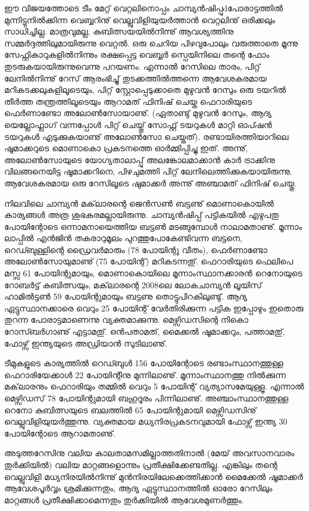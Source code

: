 ഈ വിജയത്തോടെ ടീം മേറ്റ് വെറ്റലിനൊപ്പം ചാമ്പ്യന്‍ഷിപ്പുdപോരാട്ടത്തില്‍ മുന്നിട്ടുനില്‍ക്കിന്ന വെബ്ബറിനു് 
വെല്ലുവിളിയുയര്‍ത്താന്‍ വെറ്റലിനു് ഒരിക്കലും സാധിച്ചില്ല. മാത്രവുമല്ല, കുബിത്സയയില്‍നിന്നു് ആവശ്യത്തിനു 
സമ്മര്‍ദ്ദത്തിലുമായിരുന്നു വെറ്റല്‍. ഒരു ചെറിയ പിഴവുപോലും വരുത്താതെ മൂന്നു സേഫ്റ്റികാറുകളില്‍നിന്നും രക്ഷപ്പെട്ട 
വെബ്ബര്‍ സ്പെയിനിലെ തന്റെ ഫോം തുടരുകയായിരുന്നുവെന്നു പറയണം. എന്നാല്‍ റേസിലെ താരം, പിറ്റ് ലേനില്‍നിന്നു് 
റേസ് ആരംഭിച്ചു് തുടക്കത്തില്‍ത്തന്നെ ആവേശകരമായ മറികടക്കലുകളിലൂടെയും, പിറ്റ് സ്റ്റോപ്പെടുക്കാതെ മുഴുവന്‍ റേസും 
ഒരു ടയറില്‍ തീര്‍ത്ത തന്ത്രത്തിലൂടെയും ആറാമത് ഫിനിഷ് ചെയ്ത ഫെറാരിയുടെ ഫെര്‍ണാണ്ടോ അലോണ്‍സോയാണു്. 
(ഏതാണ്ടു് മുഴുവന്‍ റേസും, ആദ്യ യെല്ലോഫ്ലാഗ് വന്നപ്പോള്‍ പിറ്റ് ചെയ്തു് സോഫ്റ്റ് ടയറുകള്‍ മാറ്റി ഓപ്ഷന്‍ ടയറുകള്‍ 
എടുക്കുകയാണു് അലോണ്‍സോ ചെയ്തത്). രണ്ടായിരത്തിയാറിലെ ഷൂമാക്കറുടെ മൊണാകൊ പ്രകടനത്തെ ഓര്‍മ്മിപ്പിച്ചു 
ഇത്. അന്നു്, അലോണ്‍സോയുടെ യോഗ്യതാലാപ്പു് അലങ്കോലമാക്കാന്‍ കാര്‍ ട്രാക്കിനു വിലങ്ങനെയിട്ട ഷൂമാക്കറിനെ, 
പിഴചുമത്തി പിറ്റ് ലേനിലെത്തിക്കുകയായിരുന്നു. ആവേശകരമായ ഒരു റേസിലൂടെ ഷുമാക്കര്‍ അന്നു് അഞ്ചാമത് ഫിനിഷ് 
ചെയ്തു.

നിലവിലെ ചാമ്പ്യന്‍ മക്‌ലാരന്റെ ജെന്‍സണ്‍ ബട്ടണു് മൊണാകൊയില്‍ കാര്യങ്ങള്‍ അത്ര ശുഭകരമല്ലായിരുന്നു. 
ചാമ്പ്യന്‍ഷിപ്പ് പട്ടികയില്‍ എഴുപതു പോയിന്റോടെ ഒന്നാമനായെത്തിയ ബട്ടണ്‍ മടങ്ങുമ്പോള്‍ നാലാമതാണു്. മൂന്നാം 
ലാപ്പില്‍ എന്‍ജിന്‍ തകരാറുമൂലം പുറത്തുപോകേണ്ടിവന്ന ബട്ടനെ, റെഡ്ബുള്ളിന്റെ ഡ്രൈവര്‍മാരും (78 പോയിന്റു വീതം),
ഫെര്‍ണാണ്ടോ അലോണ്‍സോയുമാണു് (75 പോയിന്റ്) മറികടന്നതു്. ഫെറാരിയുടെ ഫെലിപെ മസ്സ 61 പോയിന്റുമായും, 
മൊണാകൊയിലെ മൂന്നാംസ്ഥാനക്കാരന്‍ റെനോയുടെ റോബര്‍ട്ട് കുബിത്സയും, മക്‌ലാരന്റെ 2008ലെ ലോകചാമ്പ്യന്‍ 
ലൂയിസ് ഹാമില്‍ട്ടണ്‍ 59 പോയിന്റുമായും ബട്ടണു തൊട്ടുപിറകിലുണ്ടു്. ആദ്യ ഏട്ടുസ്ഥാനക്കാരെ വെറും 25 പോയിന്റ് 
വേര്‍തിരിക്കുന്ന പട്ടിക ഇപ്പോഴും ഇതൊരു തുറന്ന പോരാട്ടമാണെന്നു വ്യക്തമാക്കുന്നു. മെഴ്സിഡസിന്റെ നികൊ 
റോസ്ബര്‍ഗാണു് എട്ടാമതു്. ഒന്‍പതാമത്, മൈക്കല്‍ ഷൂമാക്കറും, പത്താമതു്, ഫോഴ്സ് ഇന്ത്യയുടെ അഡ്രിയാന്‍ സുടിലാണു്.

ടീമുകളുടെ കാര്യത്തില്‍ റെഡ്ബുള്‍ 156 പോയിന്റോടെ രണ്ടാംസ്ഥാനത്തുള്ള ഫെറാരിയേക്കാള്‍ 22 പോയിന്റിനു 
മുന്നിലാണു്. മൂന്നാംസ്ഥാനത്തു നില്‍ക്കുന്ന മക്‌ലാരനും ഫെറാരിയും തമ്മില്‍ വെറും 5 പോയിന്റ് വ്യത്യാസമേയുള്ളൂ. 
എന്നാല്‍ മെഴ്സിഡസ് 78 പോയിന്റുമായി ബഹുദൂരം പിന്നിലാണു്. അഞ്ചാംസ്ഥാനത്തുള്ള റെനോ കുബിത്സയുടെ 
ബലത്തില്‍ 65 പോയിന്റുമായി മെഴ്സിഡസിനു് വെല്ലുവിളിയുയര്‍ത്തുന്നു. വ്യക്തമായ മധ്യനിരപ്രകടനവുമായി ഫോഴ്സ് 
ഇന്ത്യ 30 പോയിന്റോടെ ആറാമതാണു്.

അടുത്തറേസിനു വലിയ കാലതാമസമില്ലാത്തതിനാല്‍ (മേയ് അവസാനവാരം തുര്‍ക്കിയില്‍) വലിയ മാറ്റങ്ങളൊന്നും 
പ്രതീക്ഷിക്കേണ്ടതില്ല. എങ്കിലും തന്റെ വെല്ലുവിളി മധ്യനിരയില്‍നിന്നു് മുന്‍നിരയിലേക്കെത്തിക്കാന്‍ മൈക്കേല്‍ ഷൂമാക്കര്‍ 
ആവേശപൂര്‍വ്വം ശ്രമിക്കുന്നതും, ആദ്യ ഏട്ടുസ്ഥാനത്തില്‍ ഓരോ റേസിലും മാറ്റങ്ങള്‍ പ്രതീക്ഷിക്കാമെന്നതും തുര്‍ക്കിയില്‍ 
ആവേശമുണര്‍ത്തും.

